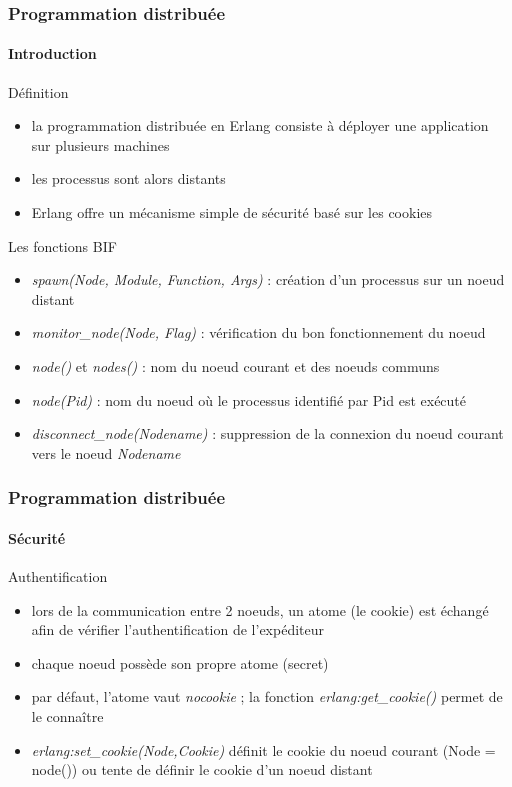 \begin{frame}[fragile]
  \frametitle{Programmation distribuée}
  \framesubtitle{Introduction}

  \begin{block}{Définition}
    \begin{itemize}
    \item la programmation distribuée en Erlang consiste à déployer une
      application sur plusieurs machines
    \item les processus sont alors distants
    \item Erlang offre un mécanisme simple de sécurité basé sur les cookies
    \end{itemize}
  \end{block}

  \begin{alertblock}{Les fonctions BIF}
    \begin{itemize}
    \item \textit{spawn(Node, Module, Function, Args)} : création d'un
      processus sur un noeud distant
    \item \textit{monitor\_node(Node, Flag)} : vérification du bon
      fonctionnement du noeud
    \item \textit{node()} et \textit{nodes()} : nom du noeud courant et des
      noeuds communs
    \item \textit{node(Pid)} : nom du noeud où le processus identifié par Pid
      est exécuté
    \item \textit{disconnect\_node(Nodename)} : suppression de la connexion
      du noeud courant vers le noeud \textit{Nodename}
    \end{itemize}
  \end{alertblock}

\end{frame}

\begin{frame}[fragile]
  \frametitle{Programmation distribuée}
  \framesubtitle{Sécurité}

  \begin{block}{Authentification}
    \begin{itemize}
    \item lors de la communication entre 2 noeuds, un atome (le cookie) est
      échangé afin de vérifier l'authentification de l'expéditeur
    \item chaque noeud possède son propre atome (secret)
    \item par défaut, l'atome vaut \textit{nocookie} ; la fonction
      \textit{erlang:get\_cookie()} permet de le connaître
    \item \textit{erlang:set\_cookie(Node,Cookie)} définit le cookie du noeud
      courant (Node = node()) ou tente de définir le cookie d'un noeud distant
    \end{itemize}
  \end{block}

\end{frame}

